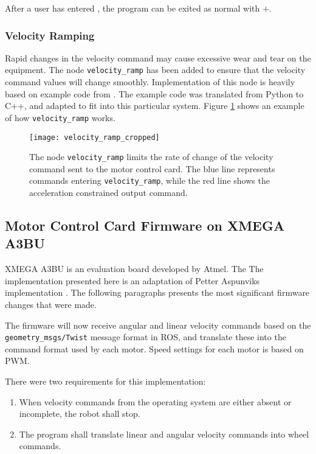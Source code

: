 After a user has entered , the program can be exited as normal with $+$.

\subsubsection{Velocity Ramping}

Rapid changes in the velocity command may cause excessive wear and tear on the equipment. The node \texttt{velocity\_ramp} has been added to ensure that the velocity command values will change smoothly. Implementation of this node is heavily based on example code from \cite{rosbook15}. The example code was translated from Python to C++, and adapted to fit into this particular system. Figure \ref{fig:velocity_ramp} shows an example of how \texttt{velocity\_ramp} works.

\begin{figure}[h]
	\centering
	\texttt{[image: velocity\_ramp\_cropped]}
	\caption{The node \texttt{velocity\_ramp} limits the rate of change of the velocity command sent to the motor control card. The blue line represents commands entering \texttt{velocity\_ramp}, while the red line shows the acceleration constrained output command.}
	\label{fig:velocity_ramp}
\end{figure}


\subsection{Motor Control Card Firmware on XMEGA A3BU}

XMEGA A3BU is an evaluation board developed by Atmel. The The implementation presented here is an adaptation of Petter Aspunviks implementation \cite{aspunvik}. The following paragraphs presents the most significant firmware changes that were made.

The firmware will now receive angular and linear velocity commands based on the \texttt{geometry\_msgs/Twist} message format in \ac{ROS}, and translate these into the command format used by each motor. Speed settings for each motor is based on \ac{PWM}. 

There were two requirements for this implementation: 
\begin{enumerate}
\item When velocity commands from the operating system are either absent or incomplete, the robot shall stop.
\item The program shall translate linear and angular velocity commands into wheel commands.
\end{enumerate}

